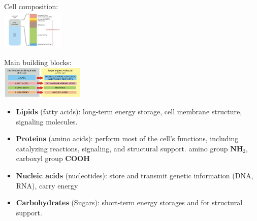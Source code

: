 \begin{minipage}{0.4\linewidth}
    Cell composition:\\
    \includegraphics[width=3cm]{src/images/cell_composition.png}
\end{minipage}
\begin{minipage}{0.45\linewidth}
    Main building blocks:\\
    \vspace{1mm}
    \includegraphics[width=4cm]{src/images/main_building_blocks.png}
\end{minipage}  

\begin{itemize}
\item \textbf{Lipids} (fatty acids): long-term energy storage, cell membrane structure, signaling molecules.
\item\textbf{Proteins} (amino acids): perform most of the cell's functions, including catalyzing reactions, signaling, and structural support.
\hspace{11mm} amino group $\textbf{NH}_2$, carboxyl group \textbf{COOH}
\item \textbf{Nucleic acids} (nucleotides): store and transmit genetic information (DNA, RNA), carry energy
\item \textbf{Carbohydrates} (Sugars): short-term energy storages and for structural support.
\end{itemize}
    
